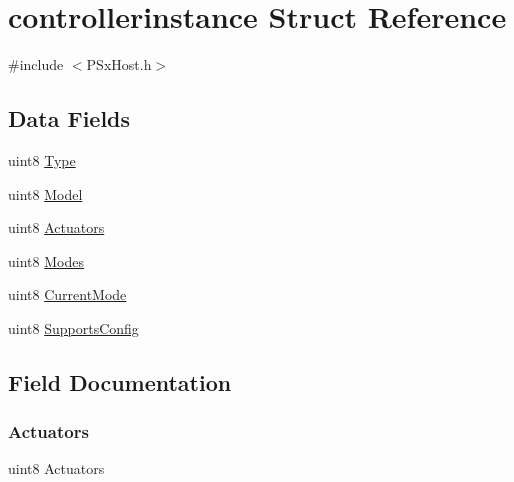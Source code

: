 \hypertarget{structcontrollerinstance}{}\section{controllerinstance Struct Reference}
\label{structcontrollerinstance}


{\ttfamily \#include $<$P\+Sx\+Host.\+h$>$}

\subsection*{Data Fields}
\begin{DoxyCompactItemize}
\item 
uint8 \mbox{\hyperlink{structcontrollerinstance_a0bb977af638c3dcf8281d902c767c9ed}{Type}}
\item 
uint8 \mbox{\hyperlink{structcontrollerinstance_aea8b25fa12a081f5ecdcd90e3721e357}{Model}}
\item 
uint8 \mbox{\hyperlink{structcontrollerinstance_aab706f5fbd65b80a027130494eedfb4a}{Actuators}}
\item 
uint8 \mbox{\hyperlink{structcontrollerinstance_ab472fa564d19bec89695b695308bac1c}{Modes}}
\item 
uint8 \mbox{\hyperlink{structcontrollerinstance_a3052f38614dc4e49125467eb9340bc24}{Current\+Mode}}
\item 
uint8 \mbox{\hyperlink{structcontrollerinstance_a6bae6183a7f1b4954bd118c4acd9f47f}{Supports\+Config}}
\end{DoxyCompactItemize}


\subsection{Field Documentation}
\mbox{\label{structcontrollerinstance_aab706f5fbd65b80a027130494eedfb4a}} 
\subsubsection{\texorpdfstring{Actuators}{Actuators}}
{\footnotesize\ttfamily uint8 Actuators}

\mbox{\label{structcontrollerinstance_a3052f38614dc4e49125467eb9340bc24}} 
